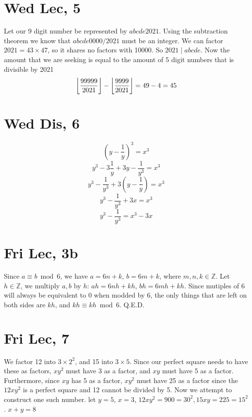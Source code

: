 \documentclass[12pt]{article}
\newcommand{\Z}{\mathbb{Z}}
\DeclarePairedDelimiter\floor{\lfloor}{\rfloor}
\begin{document}
\newpage

\section{Wed Lec, 5}
Let our 9 digit number be represented by $abcde2021$. Using the subtraction theorem we know that $abcde0000/2021$ must be an integer.
\newline
We can factor $2021 = 43 \times 47$, so it shares no factors with 10000. So $2021 \mid abcde$. Now the amount that we are seeking is equal to the amount of 5 digit numbers that is divisible by 2021
$$\floor*{\frac{99999}{2021}}-\floor*{\frac{9999}{2021}} = 49-4=45$$
\newpage

\section{Wed Dis, 6}
$$(y-\frac{1}{y})^3 = x^3$$
$$y^3 -3 \frac{1}{y} + 3 y-\frac{1}{y^3} = x^3$$
$$y^3-\frac{1}{y^3}+3(y-\frac{1}{y})=x^3$$
$$y^3-\frac{1}{y^3}+3x = x^3$$
$$y^3-\frac{1}{y^3}= x^3-3x$$
\newpage

\section{Fri Lec, 3b}
Since $a \equiv b \bmod 6$, we have $a = 6n + k$, $b = 6m + k$, where $m,n,k \in \Z$.
\newline
Let $h \in \Z$, we multiply $a, b$ by $h$: $ah = 6nh + kh$, $bh = 6mh + kh$.
\newline
Since mutiples of 6 will always be equivalent to 0 when modded by 6, the only things that are left on both sides are $kh$, and $kh \equiv kh \bmod 6$.
\newline
Q.E.D.

\section{Fri Lec, 7}
We factor 12 into $3 \times 2^2$, and 15 into $3 \times 5$. Since our perfect square needs to have these as factors, $xy^2$ must have 3 as a factor, and $xy$ must have 5 as a factor.
\newline
Furthermore, since $xy$ has 5 as a factor, $xy^2$ must have 25 as a factor since the $12xy^2$ is a perfect square and 12 cannot be divided by 5. Now we attempt to construct one such number. let $y = 5$, $x=3$, $12xy^2 = 900 = 30^2, 15xy = 225 = 15^2$. $x+y = 8$
\end{document}
